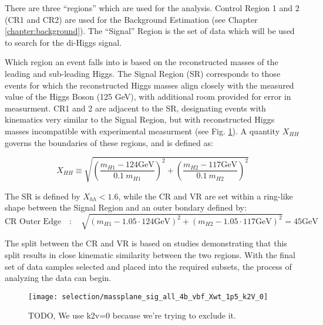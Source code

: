         There are three ``regions'' which are used for the analysis.
        Control Region 1 and 2 (CR1 and CR2) are used for the Background Estimation (see Chapter \ref{chapter:background}).
        The ``Signal'' Region is the set of data which will be used to search for the di-Higgs signal.

        Which region an event falls into is based on the reconstructed masses of the leading and sub-leading Higgs.
        The Signal Region (SR) corresponds to those events for which the reconstructed Higgs masses
            align closely with the measured value of the Higgs Boson (125 GeV), with additional room provided for error in measurment.
        CR1 and 2 are adjacent to the SR, designating events with kinematics very similar to the Signal Region,
            but with reconstructed Higgs masses incompatible with experimental measurment (see Fig. \ref{fig:region_definition}).
        A quantity $X_{HH}$ governs the boundaries of these regions, and is defined as:

        \begin{equation}
            X_{HH} \equiv \sqrt{\left(\frac{m_{H1} - 124\textrm{GeV}}{0.1 \ m_{H1}}\right)^{2}
                + \left(\frac{m_{H2} - 117\textrm{GeV}}{0.1 \ m_{H2}}\right)^{2}}
            \label{eq:xhh}
        \end{equation}
        
        The SR is defined by $X_{hh} < 1.6$,
            while the CR and VR are set within a ring-like shape between the Signal Region
            and an outer bondary defined by:
        \begin{equation}
            \text{CR\ Outer\ Edge} \quad : \quad \sqrt{ \left(m_{H1} - 1.05 \cdot 124\textrm{GeV}\right)^2
                +  \left(m_{H2} - 1.05 \cdot 117\textrm{GeV}\right)^2 } = 45\textrm{GeV}
            \label{eq:cr_out}
        \end{equation}
        
        The split between the CR and VR is based on studies demonstrating that this split results in
            close kinematic similarity between the two regions.
        With the final set of data samples selected and placed into the required subsets, 
            the process of analyzing the data can begin.

        \begin{figure}[tbh]
            \texttt{[image: selection/massplane\_sig\_all\_4b\_vbf\_Xwt\_1p5\_k2V\_0]}
            \caption{
                TODO, We use k2v=0 because we're trying to exclude it.\cite{hh4b_2021_int_note}
            }
            \label{fig:region_definition}
        \end{figure}
